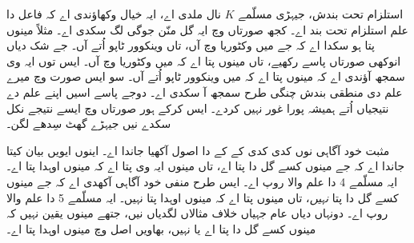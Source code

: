 \documentclass[../../../include/open-logic-section]{subfiles}
\begin{document}
استلزام تحت بندش، جیہڑی مسلّمے $K$ نال ملدی اے، ایہ خیال وکھاؤندی
اے کہ فاعل دا علم استلزام تحت بند اے۔ کجھ صورتاں وچ ایہ گل منّن
جوگی لگ سکدی اے۔ مثلاً مینوں پتا ہو سکدا اے کہ جے میں وکٹوریا وچ
آں، تاں وینکوور ٹاپو اُتے آں۔ جے شک دیاں انوکھی صورتاں پاسے رکھیے،
تاں مینوں پتا اے کہ میں وکٹوریا وچ آں۔ ایس توں ایہ وی سمجھ آؤندی اے
کہ مینوں پتا اے کہ میں وینکوور ٹاپو اُتے آں۔ سو ایس صورت وچ میرے
علم دی منطقی بندش چنگی طرح سمجھ آ سکدی اے۔ دوجے پاسے اسیں اپنے علم
دے نتیجیاں اُتے ہمیشہ پورا غور نہیں کردے۔ ایس کرکے ہور صورتاں وچ
ایسے نتیجے نکل سکدے نیں جیہڑے گھٹ سِدھے لگن۔

مثبت خود آگاہی نوں کدی کدی کے کے دا اصول آکھیا جاندا اے۔
اینوں ایویں بیان کیتا جاندا اے کہ جے مینوں کسے گل دا پتا اے، تاں
مینوں ایہ وی پتا اے کہ مینوں اوہدا پتا اے۔ ایہ مسلّمے 4 دا علم
والا روپ اے۔ ایس طرح منفی خود آگاہی آکھدی اے کہ جے مینوں کسے
گل دا پتا \emph{نہیں}، تاں مینوں پتا اے کہ مینوں اوہدا پتا نہیں۔
ایہ مسلّمے 5 دا علم والا روپ اے۔ دونہاں دیاں عام جہیاں خلاف مثالاں
لگدیاں نیں، جتھے مینوں یقین نہیں کہ مینوں کسے گل دا پتا اے یا
نہیں، بھاویں اصل وچ مینوں اوہدا پتا اے۔
\end{document}
